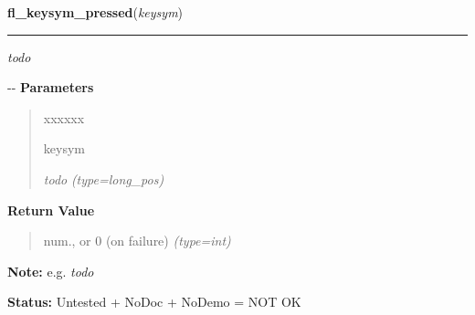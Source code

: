 \hspace{.8\funcindent}\begin{boxedminipage}{\funcwidth}

    \raggedright \textbf{fl\_keysym\_pressed}(\textit{keysym})

    \vspace{-1.5ex}

    \rule{\textwidth}{0.5\fboxrule}
\setlength{\parskip}{2ex}

\emph{todo}

-{}-
\setlength{\parskip}{1ex}
      \textbf{Parameters}
      \vspace{-1ex}

      \begin{quote}
        \begin{Ventry}{xxxxxx}

          \item[keysym]


\emph{todo}
            {\it (type=long\_pos)}

        \end{Ventry}

      \end{quote}

      \textbf{Return Value}
    \vspace{-1ex}

      \begin{quote}

num., or 0 (on failure)
      {\it (type=int)}

      \end{quote}

\textbf{Note:} 
e.g. \emph{todo}


\textbf{Status:} 
Untested + NoDoc + NoDemo = NOT OK


    \end{boxedminipage}

    \label{xformslib:flxbasic:fl_keysym_pressed}

    \vspace{0.5ex}

